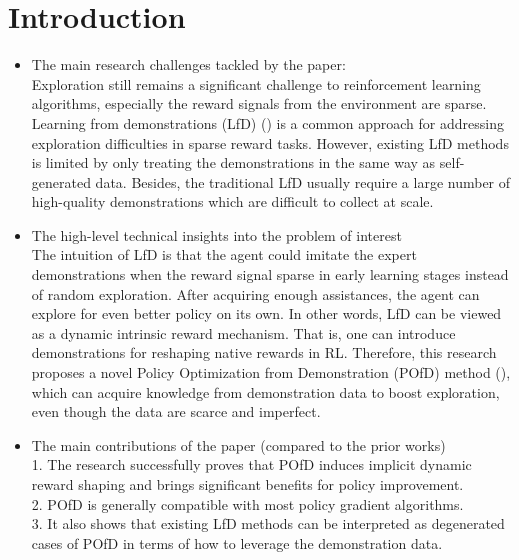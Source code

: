 \section{Introduction}
\label{section:intro}

\begin{itemize}
    \item The main research challenges tackled by the paper: \\
    Exploration still remains a significant challenge to reinforcement learning algorithms, especially the reward signals from the environment are sparse. Learning from demonstrations (LfD) (\cite{hester2018deep,vecerik2017leveraging}) is a common approach for addressing exploration difficulties in sparse reward tasks. However, existing LfD methods is limited by only treating the demonstrations in the same way as self-generated data. Besides, the traditional LfD usually require a large number of high-quality demonstrations which are difficult to collect at scale.
    \item The high-level technical insights into the problem of interest \\
    The intuition of LfD is that the agent could imitate the expert demonstrations when the reward signal sparse in early learning stages instead of random exploration. After acquiring enough assistances, the agent can explore for even better policy on its own. In other words, LfD can be viewed as a dynamic intrinsic reward mechanism. That is, one can introduce demonstrations for reshaping native rewards in RL. Therefore, this research proposes a novel Policy Optimization from Demonstration (POfD) method (\cite{kang2018policy}), which can acquire knowledge from demonstration data to boost exploration, even though the data are scarce and imperfect. 
    \item The main contributions of the paper (compared to the prior works) \\
    1.	The research successfully proves that POfD induces implicit dynamic reward shaping and brings significant benefits for policy improvement.\\
    2.	POfD is generally compatible with most policy gradient algorithms. \\
    3.	It also shows that existing LfD methods \cite{vecerik2017leveraging} can be interpreted as degenerated cases of POfD in terms of how to leverage the demonstration data. 


\end{itemize}
